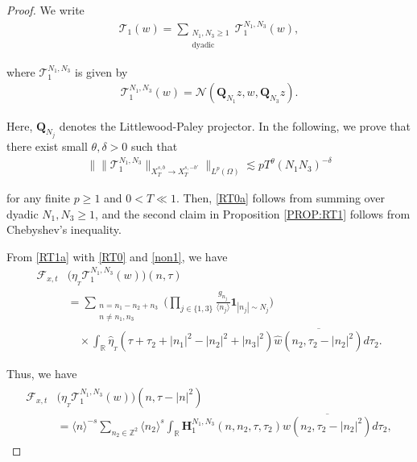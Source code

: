 \documentclass[%
11pt,  reqno]{amsart}
\newcommand{\1}{\hspace{0.2mm}\text{I}\hspace{0.2mm}}
\newcommand{\noi}{\noindent}
\newcommand{\Z}{\mathbb{Z}}
\newcommand{\R}{\mathbb{R}}
\newcommand{\Q}{\mathbf{Q}}
\newcommand{\F}{\mathcal{F}}
\newcommand{\dl}{\delta}
\newcommand{\ft}{\widehat}
\newcommand{\cj}{\overline}
\newcommand{\ta}{\theta}
\renewcommand{\O}{\Omega}
\newcommand{\les}{\lesssim}
\newcommand{\jb}[1]
{\langle #1 \rangle}
\newcommand{\ind}{\mathbf 1}
\newcommand{\NN}{\mathcal{N}}
\numberwithin{equation}{section}
\numberwithin{theorem}{section}
\newcommand{\Hb}{\mathbf{H}}
\newcommand{\TT}{\mathcal{T}}
\begin{document}
\begin{proof} %



We write
\begin{align*}
\TT_1(w) = \sum_{\substack{N_1,N_3\ge 1\\\text{dyadic}}} \TT_1^{N_1,N_3} (w),
\end{align*}



\noi
where $\TT_1^{N_1,N_3}$ is given by 
\begin{align}
\TT_1^{N_1,N_3} (w) =  \NN(\Q_{N_1} z, w,\Q_{N_3} z).
\label{RT1a}
\end{align}



\noi
Here, $\Q_{N_j}$ denotes the Littlewood-Paley projector.
In the following, we prove
that there exist small $\ta, \dl > 0$ such that 
\begin{align}
\Big\| \| \TT_1^{N_1,N_3} \|_{X^{s,b}_T \to 
X^{s,-b'}_T} \Big\|_{L^p (\O)} 
\les p  T^\ta (N_1N_3)^{-\dl} 
\label{RT2}
\end{align}

\noi
for any finite $p \ge 1$ and $0 < T\ll 1$.
Then, 
\eqref{RT0a} follows from summing over dyadic
$N_1, N_3 \ge 1$, 
and the second claim in 
Proposition \ref{PROP:RT1}
follows  from Chebyshev's inequality. %


From \eqref{RT1a} with \eqref{RT0} and \eqref{non1}, we have 
\begin{align*}
 \F_{x, t} &
\big(\eta_{_T}\TT_1^{N_1,N_3} (w)\big)
 (n,\tau) \\
& = \sum_{\substack{n = n_1 - n_2 + n_3\\ n \neq n_1,n_3}} 
\bigg(\prod_{j \in \{1, 3\}}
\frac{g_{n_j} }{\jb{n_j}}
\ind_{|n_j|\sim N_j}\bigg)\\
& \quad \times  \int_{\R} \ft \eta_{_T} (\tau + \tau_2 + |n_1|^2 - |n_2|^2 + |n_3|^2) 
\cj{\ft w (n_2, \tau_2 - |n_2|^2)} d\tau_2.
\end{align*} 

\noi 
Thus, we have 
\begin{align}
\begin{split}
 \F_{x, t} &
\big(\eta_{_T} \TT_1^{N_1,N_3} (w)\big)
 (n,\tau -|n|^2) \\
&= \jb{n}^{-s} \sum_{n_2\in \Z^2 } \jb{n_2}^s 
\int_\R 
\Hb_1^{N_1, N_3} (n,n_2,\tau, \tau_2) 
\cj{ \ft w(n_2, \tau_2 - |n_2|^2) } 
d\tau_2,
\end{split}
\label{RT3}
\end{align} 


\end{proof}
\end{document}

